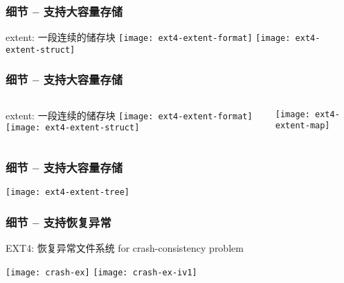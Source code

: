 \begin{frame}[fragile]
	\frametitle{细节 -- 支持大容量存储}
		\Large
	extent: 一段连续的储存块
\centering
	\texttt{[image: ext4-extent-format]}
	\texttt{[image: ext4-extent-struct]}
\end{frame}


\begin{frame}[fragile]
	\frametitle{细节 -- 支持大容量存储}
	\begin{columns}
	\begin{column}{.4\textwidth}
		
	extent: 一段连续的储存块
\centering
\texttt{[image: ext4-extent-format]}
\texttt{[image: ext4-extent-struct]}
		
	\end{column}
	
		\begin{column}{.6\textwidth}			

	\texttt{[image: ext4-extent-map]}

	
\end{column}
\end{columns}

\end{frame}


\begin{frame}[fragile]
	\frametitle{细节 -- 支持大容量存储}
	\centering
	\texttt{[image: ext4-extent-tree]}

\end{frame}




\begin{frame}[fragile]
	\frametitle{细节 -- 支持恢复异常}
	EXT4: 恢复异常文件系统 for crash-consistency problem
	
	\centering
	\texttt{[image: crash-ex]}
	\texttt{[image: crash-ex-iv1]}
\end{frame}


